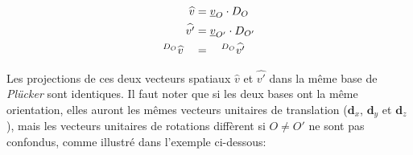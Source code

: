 \documentclass{report}
\begin{document}
\begin{align}
\widehat{v}  &= \underline{v}_{O} \cdot D_{O} \notag \\
\widehat{v'} &= \underline{v}_{O'} \cdot D_{O'} \notag \\
^{D_{O}}\widehat{v} \quad &= \quad ^{D_{O}}\widehat{v'}
\end{align}


Les projections de ces deux vecteurs spatiaux $\widehat{v}$ et $\widehat{v'}$ dans la même base de \emph{Plücker} sont identiques. Il faut noter que si les deux bases ont la même orientation, elles auront les mêmes vecteurs unitaires de translation ($\textbf{d}_{x}$, $\textbf{d}_{y}$ et $\textbf{d}_{z}$), mais les vecteurs unitaires de rotations diffèrent si $O \neq O'$ ne sont pas confondus, comme illustré dans l'exemple ci-dessous:
\end{document}
